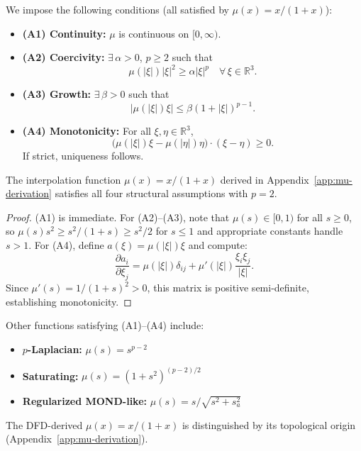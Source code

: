 We impose the following conditions (all satisfied by $\mu(x) = x/(1+x)$):

\begin{itemize}
\item \textbf{(A1) Continuity:} $\mu$ is continuous on $[0,\infty)$.

\item \textbf{(A2) Coercivity:} $\exists\,\alpha > 0$, $p \geq 2$ such that
\begin{equation}
\mu(|\xi|)|\xi|^2 \geq \alpha|\xi|^p \quad \forall\,\xi \in \mathbb{R}^3.
\end{equation}

\item \textbf{(A3) Growth:} $\exists\,\beta > 0$ such that
\begin{equation}
|\mu(|\xi|)\xi| \leq \beta(1 + |\xi|)^{p-1}.
\end{equation}

\item \textbf{(A4) Monotonicity:} For all $\xi, \eta \in \mathbb{R}^3$,
\begin{equation}
\bigl(\mu(|\xi|)\xi - \mu(|\eta|)\eta\bigr) \cdot (\xi - \eta) \geq 0.
\end{equation}
If strict, uniqueness follows.
\end{itemize}

\begin{lemma}\label{lem:mu-satisfies-U}
The interpolation function $\mu(x) = x/(1+x)$ derived in Appendix~\ref{app:mu-derivation} 
satisfies all four structural assumptions with $p = 2$.
\end{lemma}

\begin{proof}
(A1) is immediate. For (A2)--(A3), note that $\mu(s) \in [0,1)$ for all $s \geq 0$, 
so $\mu(s)s^2 \geq s^2/(1+s) \geq s^2/2$ for $s \leq 1$ and appropriate constants 
handle $s > 1$. For (A4), define $a(\xi) = \mu(|\xi|)\xi$ and compute:
\begin{equation}
\frac{\partial a_i}{\partial \xi_j} = \mu(|\xi|)\delta_{ij} + \mu'(|\xi|)\frac{\xi_i\xi_j}{|\xi|}.
\end{equation}
Since $\mu'(s) = 1/(1+s)^2 > 0$, this matrix is positive semi-definite, 
establishing monotonicity.
\end{proof}

\begin{remark}
Other functions satisfying (A1)--(A4) include:
\begin{itemize}[nosep]
\item \textbf{$p$-Laplacian:} $\mu(s) = s^{p-2}$
\item \textbf{Saturating:} $\mu(s) = (1+s^2)^{(p-2)/2}$
\item \textbf{Regularized MOND-like:} $\mu(s) = s/\sqrt{s^2 + s_a^2}$
\end{itemize}
The DFD-derived $\mu(x) = x/(1+x)$ is distinguished by its topological origin 
(Appendix~\ref{app:mu-derivation}).
\end{remark}

